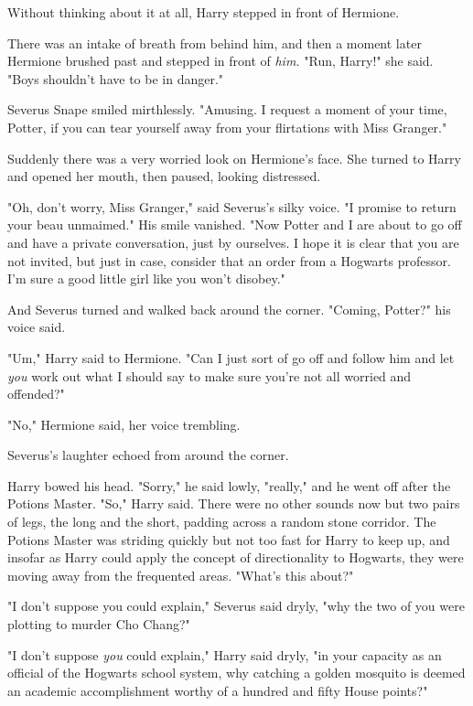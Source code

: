 Without thinking about it at all, Harry stepped in front of Hermione.

There was an intake of breath from behind him, and then a moment later Hermione 
brushed past and stepped in front of \emph{him.} "Run, Harry!" she said. "Boys 
shouldn't have to be in danger."

Severus Snape smiled mirthlessly. "Amusing. I request a moment of your time, 
Potter, if you can tear yourself away from your flirtations with Miss Granger."

Suddenly there was a very worried look on Hermione's face. She turned to Harry 
and opened her mouth, then paused, looking distressed.

"Oh, don't worry, Miss Granger," said Severus's silky voice. "I promise to 
return your beau unmaimed." His smile vanished. "Now Potter and I are about to 
go off and have a private conversation, just by ourselves. I hope it is clear 
that you are not invited, but just in case, consider that an order from a 
Hogwarts professor. I'm sure a good little girl like you won't disobey."

And Severus turned and walked back around the corner. "Coming, Potter?" his 
voice said.

"Um," Harry said to Hermione. "Can I just sort of go off and follow him and let 
\emph{you} work out what I should say to make sure you're not all worried and 
offended?"

"No," Hermione said, her voice trembling.

Severus's laughter echoed from around the corner.

Harry bowed his head. "Sorry," he said lowly, "really," and he went off after 
the Potions Master.
\sbreak
"So," Harry said. There were no other sounds now but two pairs of legs, the 
long and the short, padding across a random stone corridor. The Potions Master 
was striding quickly but not too fast for Harry to keep up, and insofar as 
Harry could apply the concept of directionality to Hogwarts, they were moving 
away from the frequented areas. "What's this about?"

"I don't suppose you could explain," Severus said dryly, "why the two of you 
were plotting to murder Cho Chang?"

"I don't suppose \emph{you} could explain," Harry said dryly, "in your capacity 
as an official of the Hogwarts school system, why catching a golden mosquito is 
deemed an academic accomplishment worthy of a hundred and fifty House points?"

